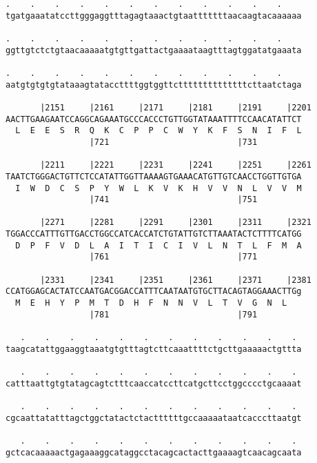 \documentclass{article}
\begin{document}
\begin{Verbatim}
.    .    .    .    .    .    .    .    .    .    .    .    
tgatgaaatatccttgggaggtttagagtaaactgtaatttttttaacaagtacaaaaaa
                                                            
.    .    .    .    .    .    .    .    .    .    .    .    
ggttgtctctgtaacaaaaatgtgttgattactgaaaataagtttagtggatatgaaata
                                                            
.    .    .    .    .    .    .    .    .    .    .    .    
aatgtgtgtgtataaagtataccttttggtggttcttttttttttttttcttaatctaga
                                                            
       |2151     |2161     |2171     |2181     |2191     |2201
AACTTGAAGAATCCAGGCAGAAATGCCCACCCTGTTGGTATAAATTTTCCAACATATTCT
  L  E  E  S  R  Q  K  C  P  P  C  W  Y  K  F  S  N  I  F  L
                 |721                          |731         
  
       |2211     |2221     |2231     |2241     |2251     |2261
TAATCTGGGACTGTTCTCCATATTGGTTAAAAGTGAAACATGTTGTCAACCTGGTTGTGA
  I  W  D  C  S  P  Y  W  L  K  V  K  H  V  V  N  L  V  V  M
                 |741                          |751         
  
       |2271     |2281     |2291     |2301     |2311     |2321
TGGACCCATTTGTTGACCTGGCCATCACCATCTGTATTGTCTTAAATACTCTTTTCATGG
  D  P  F  V  D  L  A  I  T  I  C  I  V  L  N  T  L  F  M  A
                 |761                          |771         
  
       |2331     |2341     |2351     |2361     |2371     |2381
CCATGGAGCACTATCCAATGACGGACCATTTCAATAATGTGCTTACAGTAGGAAACTTGg
  M  E  H  Y  P  M  T  D  H  F  N  N  V  L  T  V  G  N  L   
                 |781                          |791         
  
   .    .    .    .    .    .    .    .    .    .    .    . 
taagcatattggaaggtaaatgtgtttagtcttcaaattttctgcttgaaaaactgttta
                                                            
   .    .    .    .    .    .    .    .    .    .    .    . 
catttaattgtgtatagcagtctttcaaccatccttcatgcttcctggcccctgcaaaat
                                                            
   .    .    .    .    .    .    .    .    .    .    .    . 
cgcaattatatttagctggctatactctacttttttgccaaaaataatcacccttaatgt
                                                            
   .    .    .    .    .    .    .    .    .    .    .    . 
gctcacaaaaactgagaaaggcataggcctacagcactacttgaaaagtcaacagcaata
                                                            

\end{Verbatim}
\end{document}
